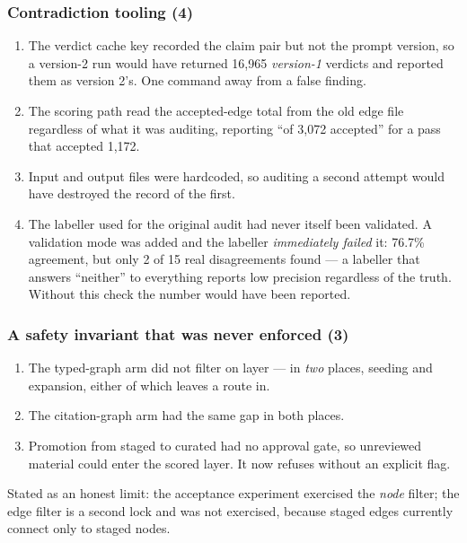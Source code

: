 \subsubsection*{Contradiction tooling (4)}

\begin{enumerate}[label=D\arabic*.]
  \item The verdict cache key recorded the claim pair but not the prompt
        version, so a version-2 run would have returned 16,965 \emph{version-1}
        verdicts and reported them as version 2's. One command away from a false
        finding.
  \item The scoring path read the accepted-edge total from the old edge file
        regardless of what it was auditing, reporting ``of 3,072 accepted'' for
        a pass that accepted 1,172.
  \item Input and output files were hardcoded, so auditing a second attempt
        would have destroyed the record of the first.
  \item The labeller used for the original audit had never itself been
        validated. A validation mode was added and the labeller \emph{immediately
        failed} it: 76.7\% agreement, but only 2 of 15 real disagreements found
        --- a labeller that answers ``neither'' to everything reports low
        precision regardless of the truth. Without this check the number would
        have been reported.
\end{enumerate}

\subsubsection*{A safety invariant that was never enforced (3)}

\begin{enumerate}[label=E\arabic*.]
  \item The typed-graph arm did not filter on layer --- in \emph{two} places,
        seeding and expansion, either of which leaves a route in.
  \item The citation-graph arm had the same gap in both places.
  \item Promotion from staged to curated had no approval gate, so unreviewed
        material could enter the scored layer. It now refuses without an
        explicit flag.
\end{enumerate}

Stated as an honest limit: the acceptance experiment exercised the \emph{node}
filter; the edge filter is a second lock and was not exercised, because staged
edges currently connect only to staged nodes.

